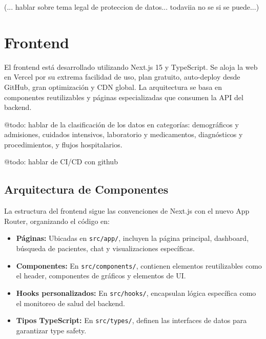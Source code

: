 
(... hablar sobre tema legal de proteccion de datos... todaviia no se si se puede...)


\section{Frontend}

El frontend está desarrollado utilizando Next.js 15 y TypeScript. Se aloja la web en Vercel por su extrema facilidad de uso, plan gratuito, auto-deploy desde GitHub, gran optimización y CDN global. La arquitectura se basa en componentes reutilizables y páginas especializadas que consumen la API del backend.

@todo: hablar de la clasificación de los datos en categorías: demográficos y admisiones, cuidados intensivos, laboratorio y medicamentos, diagnósticos y procedimientos, y flujos hospitalarios.

@todo: hablar de CI/CD con github

\subsection{Arquitectura de Componentes}

La estructura del frontend sigue las convenciones de Next.js con el nuevo App Router, organizando el código en:

\begin{itemize}
\item \textbf{Páginas:} Ubicadas en \texttt{src/app/}, incluyen la página principal, dashboard, búsqueda de pacientes, chat y visualizaciones específicas.
\item \textbf{Componentes:} En \texttt{src/components/}, contienen elementos reutilizables como el header, componentes de gráficos y elementos de UI.
\item \textbf{Hooks personalizados:} En \texttt{src/hooks/}, encapsulan lógica específica como el monitoreo de salud del backend.
\item \textbf{Tipos TypeScript:} En \texttt{src/types/}, definen las interfaces de datos para garantizar type safety.
\end{itemize}

